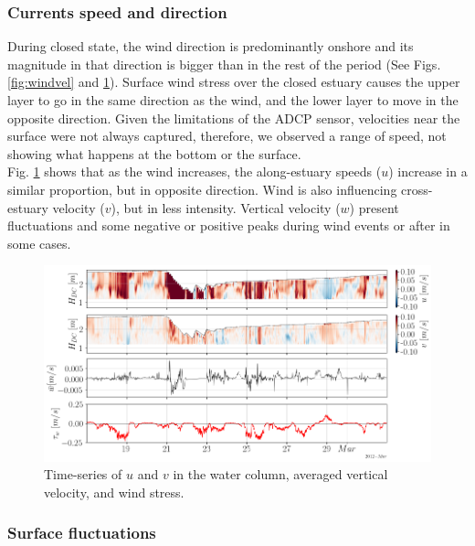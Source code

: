 \documentclass[11pt,letterpaper]{article}
\begin{document}
\subsubsection{Currents speed and direction}

During closed state, the wind direction is predominantly onshore and its magnitude in that direction is bigger than in the rest of the period (See Figs. \ref{fig:windvel} and \ref{fig:vels}). Surface wind stress over the closed estuary causes the upper layer to go in the same direction as the wind, and the lower layer to move in the opposite direction. Given the limitations of the ADCP sensor, velocities near the surface were not always captured, therefore, we observed a range of speed, not showing what happens at the bottom or the surface. \\

Fig. \ref{fig:vels} shows that as the wind increases, the along-estuary speeds ($u$) increase in a similar proportion, but in opposite direction. Wind is also influencing cross-estuary velocity ($v$), but in less intensity. Vertical velocity ($w$) present fluctuations and some negative or positive peaks during wind events or after in some cases. 


\begin{figure}[h!]
    \centering
    \includegraphics[width=\textwidth]{Imagenes/vels.png}
    \caption{Time-series of $u$ and $v$ in the water column, averaged vertical velocity, and wind stress.}
    \label{fig:vels}
\end{figure}

\subsubsection{Surface fluctuations}
\end{document}
